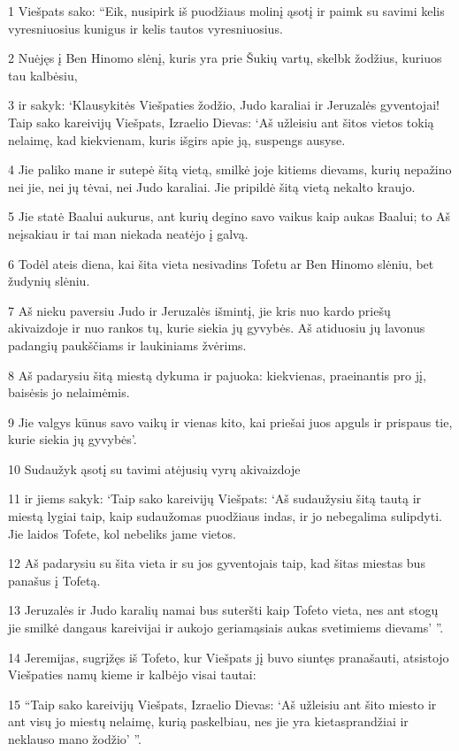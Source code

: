 \par 1 Viešpats sako: “Eik, nusipirk iš puodžiaus molinį ąsotį ir paimk su savimi kelis vyresniuosius kunigus ir kelis tautos vyresniuosius. 
\par 2 Nuėjęs į Ben Hinomo slėnį, kuris yra prie Šukių vartų, skelbk žodžius, kuriuos tau kalbėsiu, 
\par 3 ir sakyk: ‘Klausykitės Viešpaties žodžio, Judo karaliai ir Jeruzalės gyventojai! Taip sako kareivijų Viešpats, Izraelio Dievas: ‘Aš užleisiu ant šitos vietos tokią nelaimę, kad kiekvienam, kuris išgirs apie ją, suspengs ausyse. 
\par 4 Jie paliko mane ir sutepė šitą vietą, smilkė joje kitiems dievams, kurių nepažino nei jie, nei jų tėvai, nei Judo karaliai. Jie pripildė šitą vietą nekalto kraujo. 
\par 5 Jie statė Baalui aukurus, ant kurių degino savo vaikus kaip aukas Baalui; to Aš neįsakiau ir tai man niekada neatėjo į galvą. 
\par 6 Todėl ateis diena, kai šita vieta nesivadins Tofetu ar Ben Hinomo slėniu, bet žudynių slėniu. 
\par 7 Aš nieku paversiu Judo ir Jeruzalės išmintį, jie kris nuo kardo priešų akivaizdoje ir nuo rankos tų, kurie siekia jų gyvybės. Aš atiduosiu jų lavonus padangių paukščiams ir laukiniams žvėrims. 
\par 8 Aš padarysiu šitą miestą dykuma ir pajuoka: kiekvienas, praeinantis pro jį, baisėsis jo nelaimėmis. 
\par 9 Jie valgys kūnus savo vaikų ir vienas kito, kai priešai juos apguls ir prispaus tie, kurie siekia jų gyvybės’. 
\par 10 Sudaužyk ąsotį su tavimi atėjusių vyrų akivaizdoje 
\par 11 ir jiems sakyk: ‘Taip sako kareivijų Viešpats: ‘Aš sudaužysiu šitą tautą ir miestą lygiai taip, kaip sudaužomas puodžiaus indas, ir jo nebegalima sulipdyti. Jie laidos Tofete, kol nebeliks jame vietos. 
\par 12 Aš padarysiu su šita vieta ir su jos gyventojais taip, kad šitas miestas bus panašus į Tofetą. 
\par 13 Jeruzalės ir Judo karalių namai bus suteršti kaip Tofeto vieta, nes ant stogų jie smilkė dangaus kareivijai ir aukojo geriamąsiais aukas svetimiems dievams’ ”. 
\par 14 Jeremijas, sugrįžęs iš Tofeto, kur Viešpats jį buvo siuntęs pranašauti, atsistojo Viešpaties namų kieme ir kalbėjo visai tautai: 
\par 15 “Taip sako kareivijų Viešpats, Izraelio Dievas: ‘Aš užleisiu ant šito miesto ir ant visų jo miestų nelaimę, kurią paskelbiau, nes jie yra kietasprandžiai ir neklauso mano žodžio’ ”.



